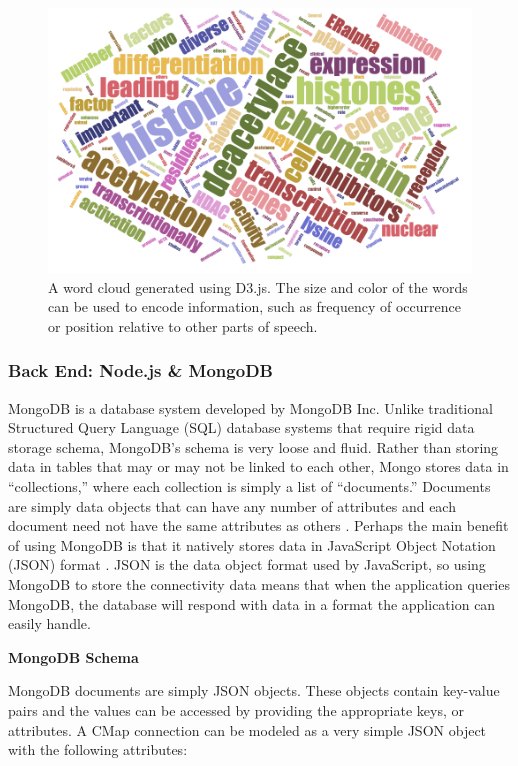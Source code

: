 \documentclass[12pt]{article}
\begin{document}
\begin{figure}[h]
\centering
\includegraphics[scale=0.5]{img/d3_word_cloud_example.png}
\caption{A word cloud generated using D3.js. The size and color of the words can be used to encode information, such as frequency of occurrence or position relative to other parts of speech.}
\label{fig:d3_word_cloud_example}
\end{figure}

\subsubsection{Back End: Node.js \& MongoDB}

MongoDB is a database system developed by MongoDB Inc. Unlike traditional Structured Query Language (SQL) database systems that require rigid data storage schema, MongoDB's schema is very loose and fluid. Rather than storing data in tables that may or may not be linked to each other, Mongo stores data in ``collections,'' where each collection is simply a list of ``documents.'' Documents are simply data objects that can have any number of attributes and each document need not have the same attributes as others \cite{mongodb}. Perhaps the main benefit of using MongoDB is that it natively stores data in JavaScript Object Notation (JSON) format \cite{json}. JSON is the data object format used by JavaScript, so using MongoDB to store the connectivity data means that when the application queries MongoDB, the database will respond with data in a format the application can easily handle.

\textbf{MongoDB Schema}

MongoDB documents are simply JSON objects. These objects contain key-value pairs and the values can be accessed by providing the appropriate keys, or attributes. A CMap connection can be modeled as a very simple JSON object with the following attributes:
\end{document}
